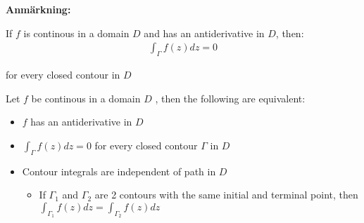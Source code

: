 \par\bigskip
\noindent\textbf{Anmärkning:}\par
\noindent If $f$ is continous in a domain $D$ and has an antiderivative in $D$, then:
\begin{equation*}
  \begin{gathered}
    \int_{\Gamma}f(z)dz = 0
  \end{gathered}
\end{equation*}\par
\noindent for every closed contour in $D$
\par\bigskip
\begin{theo}[]{}
  Let $f$ be continous in a domain $D$ , then the following are equivalent:\par
  \begin{itemize}
    \item $f$ has an antiderivative in $D$
    \item $\int_{\Gamma}f(z)dz = 0$ for every closed contour $\Gamma$ in $D$
    \item Contour integrals are independent of path in $D$\par
      \begin{itemize}
        \item If $\Gamma_1$ and $\Gamma_2$ are 2 contours with the same initial and terminal point, then $\int_{\Gamma_1}f(z) dz = \int_{\Gamma_2}f(z)dz$ 
      \end{itemize}
  \end{itemize}
\end{theo}
\par\bigskip
